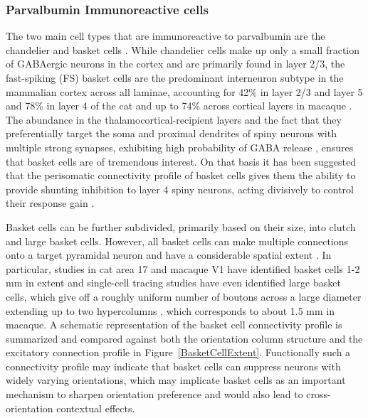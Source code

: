 \subsubsection*{Parvalbumin Immunoreactive cells}

The two main cell types that are immunoreactive to parvalbumin are the
chandelier and basket cells \citep{Binzegger2004}. While chandelier
cells make up only a small fraction of GABAergic neurons in the cortex
and are primarily found in layer 2/3, the fast-spiking (FS) basket
cells are the predominant interneuron subtype in the mammalian cortex
across all laminae, accounting for 42\% in layer 2/3 and layer 5 and
78\% in layer 4 of the cat \citep{Hogan1992,Huxlin2001} and up to 74\%
across cortical layers in macaque \citep{VanBrederode1990}. The
abundance in the thalamocortical-recipient layers and the fact that
they preferentially target the soma and proximal dendrites of spiny
neurons with multiple strong synapses, exhibiting high probability of
GABA release \citep{Freund2007,Markram2004}, ensures that basket cells
are of tremendous interest. On that basis it has been suggested that
the perisomatic connectivity profile of basket cells gives them the
ability to provide shunting inhibition to layer 4 spiny neurons,
acting divisively to control their response gain \citep{Wilson2012}.

Basket cells can be further subdivided, primarily based on their size,
into clutch and large basket cells. However, all basket cells can make
multiple connections onto a target pyramidal neuron
\citep{Somogyi1983} and have a considerable spatial extent
\citep{Kisvarday2002}. In particular, studies in cat area 17 and
macaque V1 have identified basket cells 1-2 mm in extent
\citep{Somogyi1983,Lund1987,Lund1991,Martin1983} and single-cell
tracing studies have even identified large basket cells, which give
off a roughly uniform number of boutons across a large diameter
extending up to two hypercolumns \citep{Buzas2001}, which corresponds
to about 1.5 mm in macaque. A schematic representation of the basket
cell connectivity profile is summarized and compared against both the
orientation column structure and the excitatory connection profile in
Figure~\ref{BasketCellExtent}. Functionally such a connectivity
profile may indicate that basket cells can suppress neurons with
widely varying orientations, which may implicate basket cells as an
important mechanism to sharpen orientation preference and would also
lead to cross-orientation contextual effects.

